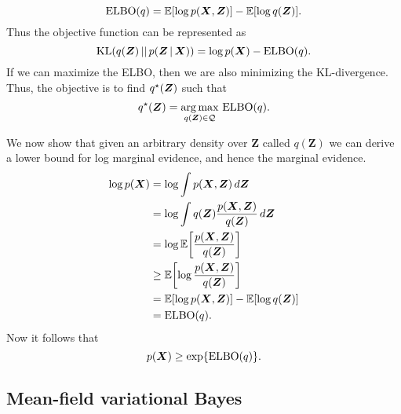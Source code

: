 \begin{equation}
	\text{ELBO} \mleft( q \mright) = \mathbb{E} \mleft[ \log p \mleft( {\bm X}, {\bm Z} \mright) \mright] - \mathbb{E} \mleft[ \log q({\bm Z}) \mright].
\end{equation}
Thus the objective function can be represented as 
\begin{equation}
	\text{KL} \mleft( q \mleft( {\bm Z} \mright) \, \vert \vert \, p \mleft( {\bm Z} \, \vert \, {\bm X} \mright) \mright) = 
	\log p \mleft( {\bm X} \mright) - \text{ELBO} \mleft( q \mright).
\end{equation}
If we can maximize the ELBO, then we are also minimizing the KL-divergence. Thus, the objective is to find $q^{\star} \mleft( {\bm Z} \mright)$ such that 
\begin{equation}
	q^{\star} \mleft( {\bm Z} \mright) = \underset{ q \mleft( {\bm Z} \mright) \in \mathcal{Q} }{\arg \max} \text{ ELBO} \mleft( q \mright).
\end{equation}

We now show that given an arbitrary density over ${\bm Z}$ called $q({\bm Z})$ we can derive a lower bound for log marginal evidence, and hence the marginal evidence.
\begin{align}
		\log p \mleft( {\bm X} \mright) 
		&= \log \int p \mleft( {\bm X}, {\bm Z} \mright) \,d{\bm Z} \\
		&= \log \int q \mleft( {\bm Z} \mright) \frac{ p \mleft( {\bm X}, {\bm Z} \mright) }{ q \mleft( {\bm Z} \mright) } \,d{\bm Z} \\
		&= \log \mathbb{E} \mleft[ \frac{ p \mleft( {\bm X}, {\bm Z} \mright) }{ q \mleft( {\bm Z} \mright) } \mright] \\
		&\geq \mathbb{E} \mleft[ \log \frac{ p \mleft( {\bm X}, {\bm Z} \mright) }{ q \mleft( {\bm Z} \mright) } \mright] \\
		&= \mathbb{E} \mleft[ \log p \mleft( {\bm X}, {\bm Z} \mright) \mright] - \mathbb{E} \mleft[ \log q \mleft( {\bm Z} \mright) \mright] \\
		&= \text{ELBO} \mleft( q \mright). 
\end{align}
Now it follows that 
\begin{equation}
	p \mleft( {\bm X} \mright) \geq \exp \mleft\{ \text{ELBO} \mleft( q \mright) \mright\}.
\end{equation}

\subsection{Mean-field variational Bayes}

